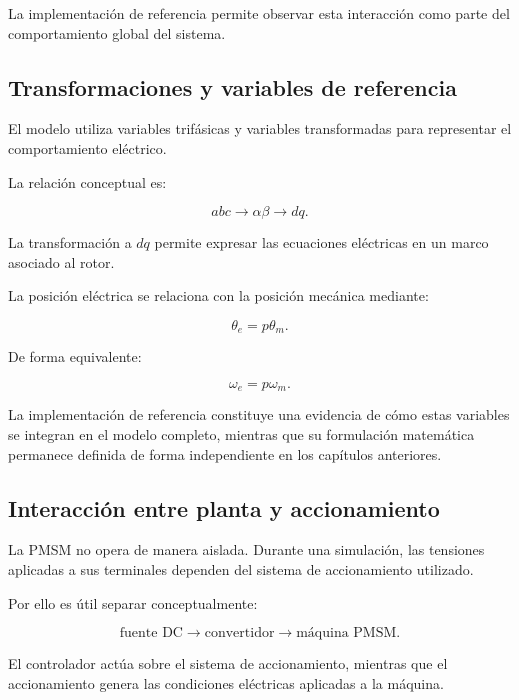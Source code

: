 La implementación de referencia permite observar esta interacción como parte del comportamiento global del sistema.

\subsection{Transformaciones y variables de referencia}

El modelo utiliza variables trifásicas y variables transformadas para representar el comportamiento eléctrico.

La relación conceptual es:

\begin{equation}
abc
\rightarrow
\alpha\beta
\rightarrow
dq.
\end{equation}

La transformación a $dq$ permite expresar las ecuaciones eléctricas en un marco asociado al rotor.

La posición eléctrica se relaciona con la posición mecánica mediante:

\begin{equation}
\theta_e=p\theta_m.
\end{equation}

De forma equivalente:

\begin{equation}
\omega_e=p\omega_m.
\end{equation}

La implementación de referencia constituye una evidencia de cómo estas variables se integran en el modelo completo, mientras que su formulación matemática permanece definida de forma independiente en los capítulos anteriores.

\subsection{Interacción entre planta y accionamiento}

La PMSM no opera de manera aislada. Durante una simulación, las tensiones aplicadas a sus terminales dependen del sistema de accionamiento utilizado.

Por ello es útil separar conceptualmente:

\begin{equation}
\text{fuente DC}
\rightarrow
\text{convertidor}
\rightarrow
\text{máquina PMSM}.
\end{equation}

El controlador actúa sobre el sistema de accionamiento, mientras que el accionamiento genera las condiciones eléctricas aplicadas a la máquina.

